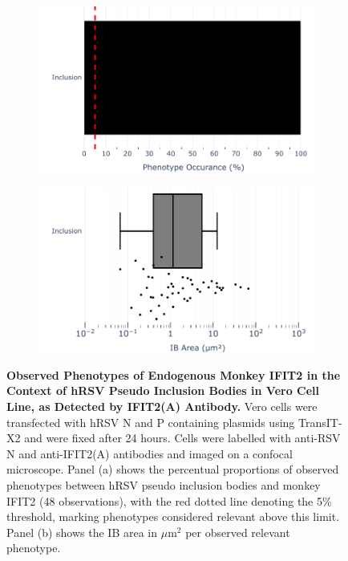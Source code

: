 \begin{figure}
    \begin{subfigure}{0.495\textwidth}
        \caption{}
        \includegraphics[width=1\linewidth]{09. Chapter 4/Figs/01. pIB/03. IFIT2/02. IFIT2A/04. bar_i2a_vero_hnhp.pdf} 
    \end{subfigure}
    \begin{subfigure}{0.495\textwidth}
        \caption{}
        \includegraphics[width=1\linewidth]{09. Chapter 4/Figs/01. pIB/03. IFIT2/02. IFIT2A/05. box_i2a_vero_hnhp.pdf}
    \end{subfigure}
    \caption[Observed Phenotypes of Endogenous Monkey IFIT2 in the Context of hRSV Pseudo Inclusion Bodies in Vero Cell Line, as Detected by IFIT2(A) Antibody.]{\textbf{Observed Phenotypes of Endogenous Monkey IFIT2 in the Context of hRSV Pseudo Inclusion Bodies in Vero Cell Line, as Detected by IFIT2(A) Antibody.} Vero cells were transfected with hRSV N and P containing plasmids using TransIT-X2 and were fixed after 24 hours. Cells were labelled with anti-RSV N and anti-IFIT2(A) antibodies and imaged on a confocal microscope. Panel (a) shows the percentual proportions of observed phenotypes between hRSV pseudo inclusion bodies and monkey IFIT2 (48 observations), with the red dotted line denoting the 5\% threshold, marking phenotypes considered relevant above this limit. Panel (b) shows the IB area in \(\mu \mbox{m}^2\) per observed relevant phenotype.}
    \label{fig:Observed Phenotypes of Endogenous Monkey IFIT2 in the Context of hRSV Pseudo Inclusion Bodies in Vero Cell Line, as Detected by IFIT2(A) Antibody}
\end{figure}

